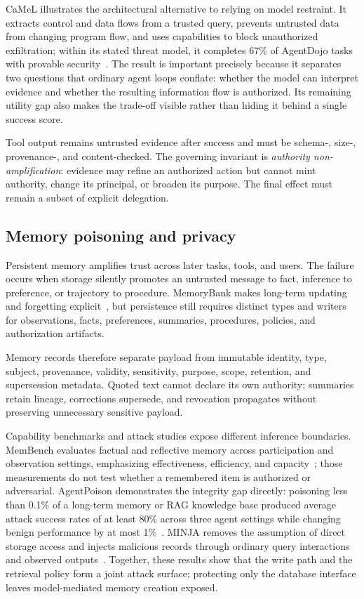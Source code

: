 CaMeL illustrates the architectural alternative to relying on model restraint. It extracts control and data flows from a trusted query, prevents untrusted data from changing program flow, and uses capabilities to block unauthorized exfiltration; within its stated threat model, it completes 67\% of AgentDojo tasks with provable security~\cite{debenedetti2025camel}. The result is important precisely because it separates two questions that ordinary agent loops conflate: whether the model can interpret evidence and whether the resulting information flow is authorized. Its remaining utility gap also makes the trade-off visible rather than hiding it behind a single success score.

Tool output remains untrusted evidence after success and must be schema-, size-, provenance-, and content-checked. The governing invariant is \emph{authority non-amplification}: evidence may refine an authorized action but cannot mint authority, change its principal, or broaden its purpose. The final effect must remain a subset of explicit delegation.

\subsection{Memory poisoning and privacy}

Persistent memory amplifies trust across later tasks, tools, and users. The failure occurs when storage silently promotes an untrusted message to fact, inference to preference, or trajectory to procedure. MemoryBank makes long-term updating and forgetting explicit~\cite{zhong2024memorybank}, but persistence still requires distinct types and writers for observations, facts, preferences, summaries, procedures, policies, and authorization artifacts.

Memory records therefore separate payload from immutable identity, type, subject, provenance, validity, sensitivity, purpose, scope, retention, and supersession metadata. Quoted text cannot declare its own authority; summaries retain lineage, corrections supersede, and revocation propagates without preserving unnecessary sensitive payload.

Capability benchmarks and attack studies expose different inference boundaries. MemBench evaluates factual and reflective memory across participation and observation settings, emphasizing effectiveness, efficiency, and capacity~\cite{tan2025membench}; those measurements do not test whether a remembered item is authorized or adversarial. AgentPoison demonstrates the integrity gap directly: poisoning less than 0.1\% of a long-term memory or RAG knowledge base produced average attack success rates of at least 80\% across three agent settings while changing benign performance by at most 1\%~\cite{chen2024agentpoison}. MINJA removes the assumption of direct storage access and injects malicious records through ordinary query interactions and observed outputs~\cite{dong2025minja}. Together, these results show that the write path and the retrieval policy form a joint attack surface; protecting only the database interface leaves model-mediated memory creation exposed.

